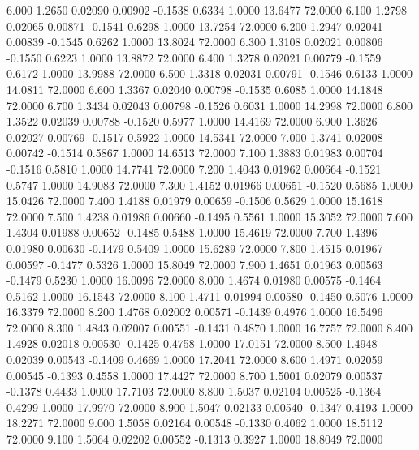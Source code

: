    6.000   1.2650   0.02090   0.00902  -0.1538   0.6334   1.0000  13.6477  72.0000
   6.100   1.2798   0.02065   0.00871  -0.1541   0.6298   1.0000  13.7254  72.0000
   6.200   1.2947   0.02041   0.00839  -0.1545   0.6262   1.0000  13.8024  72.0000
   6.300   1.3108   0.02021   0.00806  -0.1550   0.6223   1.0000  13.8872  72.0000
   6.400   1.3278   0.02021   0.00779  -0.1559   0.6172   1.0000  13.9988  72.0000
   6.500   1.3318   0.02031   0.00791  -0.1546   0.6133   1.0000  14.0811  72.0000
   6.600   1.3367   0.02040   0.00798  -0.1535   0.6085   1.0000  14.1848  72.0000
   6.700   1.3434   0.02043   0.00798  -0.1526   0.6031   1.0000  14.2998  72.0000
   6.800   1.3522   0.02039   0.00788  -0.1520   0.5977   1.0000  14.4169  72.0000
   6.900   1.3626   0.02027   0.00769  -0.1517   0.5922   1.0000  14.5341  72.0000
   7.000   1.3741   0.02008   0.00742  -0.1514   0.5867   1.0000  14.6513  72.0000
   7.100   1.3883   0.01983   0.00704  -0.1516   0.5810   1.0000  14.7741  72.0000
   7.200   1.4043   0.01962   0.00664  -0.1521   0.5747   1.0000  14.9083  72.0000
   7.300   1.4152   0.01966   0.00651  -0.1520   0.5685   1.0000  15.0426  72.0000
   7.400   1.4188   0.01979   0.00659  -0.1506   0.5629   1.0000  15.1618  72.0000
   7.500   1.4238   0.01986   0.00660  -0.1495   0.5561   1.0000  15.3052  72.0000
   7.600   1.4304   0.01988   0.00652  -0.1485   0.5488   1.0000  15.4619  72.0000
   7.700   1.4396   0.01980   0.00630  -0.1479   0.5409   1.0000  15.6289  72.0000
   7.800   1.4515   0.01967   0.00597  -0.1477   0.5326   1.0000  15.8049  72.0000
   7.900   1.4651   0.01963   0.00563  -0.1479   0.5230   1.0000  16.0096  72.0000
   8.000   1.4674   0.01980   0.00575  -0.1464   0.5162   1.0000  16.1543  72.0000
   8.100   1.4711   0.01994   0.00580  -0.1450   0.5076   1.0000  16.3379  72.0000
   8.200   1.4768   0.02002   0.00571  -0.1439   0.4976   1.0000  16.5496  72.0000
   8.300   1.4843   0.02007   0.00551  -0.1431   0.4870   1.0000  16.7757  72.0000
   8.400   1.4928   0.02018   0.00530  -0.1425   0.4758   1.0000  17.0151  72.0000
   8.500   1.4948   0.02039   0.00543  -0.1409   0.4669   1.0000  17.2041  72.0000
   8.600   1.4971   0.02059   0.00545  -0.1393   0.4558   1.0000  17.4427  72.0000
   8.700   1.5001   0.02079   0.00537  -0.1378   0.4433   1.0000  17.7103  72.0000
   8.800   1.5037   0.02104   0.00525  -0.1364   0.4299   1.0000  17.9970  72.0000
   8.900   1.5047   0.02133   0.00540  -0.1347   0.4193   1.0000  18.2271  72.0000
   9.000   1.5058   0.02164   0.00548  -0.1330   0.4062   1.0000  18.5112  72.0000
   9.100   1.5064   0.02202   0.00552  -0.1313   0.3927   1.0000  18.8049  72.0000
